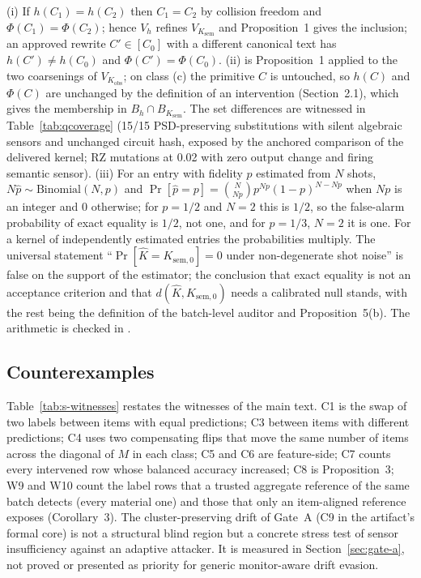 \documentclass[10pt,journal,compsoc]{IEEEtran}
\begin{document}
\begin{IEEEproof}
(i) If $h(C_1)=h(C_2)$ then $C_1=C_2$ by collision freedom and
$\Phi(C_1)=\Phi(C_2)$; hence $V_h$ refines $V_{K_{\mathrm{sem}}}$ and
Proposition~1 gives the inclusion; an approved rewrite $C'\in[C_0]$ with a
different canonical text has $h(C')\ne h(C_0)$ and $\Phi(C')=\Phi(C_0)$.
(ii) is Proposition~1 applied to the two coarsenings of $V_{K_{\mathrm{obs}}}$;
on class (c) the primitive $C$ is untouched, so $h(C)$ and $\Phi(C)$ are
unchanged by the definition of an intervention (Section~2.1), which gives the
membership in $B_h\cap B_{K_{\mathrm{sem}}}$. The set differences are
witnessed in Table~\ref{tab:qcoverage} (15/15 PSD-preserving substitutions
with silent algebraic sensors and unchanged circuit hash, exposed by the
anchored comparison of the delivered kernel; RZ mutations at 0.02 with zero
output change and firing semantic sensor). (iii) For an entry with fidelity
$p$ estimated from $N$ shots, $N\hat p\sim\mathrm{Binomial}(N,p)$ and
$\Pr[\hat p=p]=\binom{N}{Np}p^{Np}(1-p)^{N-Np}$ when $Np$ is an integer and
$0$ otherwise; for $p=1/2$ and $N=2$ this is $1/2$, so the false-alarm
probability of exact equality is $1/2$, not one, and for $p=1/3$, $N=2$ it is
one. For a kernel of independently estimated entries the probabilities
multiply. The universal statement ``$\Pr[\hat K=K_{\mathrm{sem},0}]=0$ under
non-degenerate shot noise'' is false on the support of the estimator; the
conclusion that exact
equality is not an acceptance criterion and that $d(\hat K,K_{\mathrm{sem},0})$
needs a calibrated null stands, with the rest being the definition of the
batch-level auditor and Proposition~5(b). The arithmetic is checked in
.
\end{IEEEproof}

\subsection{Counterexamples}

Table~\ref{tab:s-witnesses} restates the witnesses of the main text. C1 is
the swap of two labels between items with equal predictions; C3 between items
with different predictions; C4 uses two compensating flips that move the
same number of items across the diagonal of $M$ in each class; C5 and C6
are feature-side; C7 counts every intervened row whose balanced accuracy
increased; C8 is Proposition~3; W9 and W10 count the label rows that a
trusted aggregate reference of the same batch detects (every material one)
and those that only an item-aligned reference exposes (Corollary~3). The
cluster-preserving drift of Gate~A (C9 in the artifact's formal core) is not
a structural blind region but a concrete stress test of sensor insufficiency
against an adaptive attacker. It is measured in Section~\ref{sec:gate-a}, not
proved or presented as priority for generic monitor-aware drift evasion.
\end{document}

